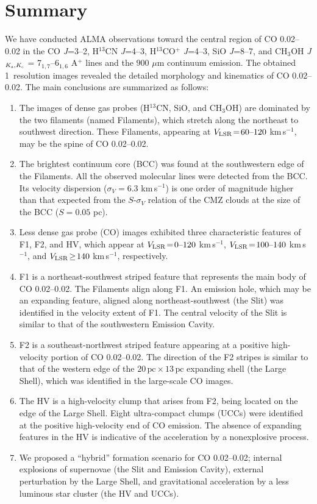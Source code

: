 \documentclass[twocolumn]{aastex631}
\newcommand\kms{\hbox{km$\,$s$^{-1}$}}
\newcommand\VLSR{\hbox{$V_{\rm LSR}$}}
\begin{document}
\section{Summary}
We have conducted ALMA observations toward the central region of CO 0.02--0.02 in the CO {\it J}=3--2, H$^{13}$CN {\it J}=4--3, H$^{13}$CO$^{+}$ {\it J}=4--3, SiO {\it J}=8--7, and CH$_3$OH {\it J}$_{\it K_a, K_c}$ = 7$_{1, 7}$--6$_{1,6}$ A$^{+}$ lines and the $900$ {\rm $\mu$m} continuum emission. The obtained 1\arcsec\ resolution images revealed the detailed morphology and kinematics of CO 0.02--0.02. The main conclusions are summarized as follows:
\begin{enumerate}
\setlength{\itemsep}{0mm}
\setlength{\parsep}{0mm}
\item The images of dense gas probes (H$^{13}$CN, SiO, and CH$_3$OH) are dominated by the two filaments (named Filaments), which stretch along the northeast to southwest direction. These Filaments, appearing at $\VLSR\!=\!60\mbox{--}120$ \kms , may be the spine of CO 0.02--0.02.  
\item The brightest continuum core (BCC) was found at the southwestern edge of the Filaments. All the observed molecular lines were detected from the BCC. Its velocity dispersion ($\sigma_{V}\!=\! 6.3$ \kms ) is one order of magnitude higher than that expected from the $S$-$\sigma_{V}$ relation of the CMZ clouds at the size of the BCC ($S\!=\! 0.05$ pc).
\item Less dense gas probe (CO) images exhibited three characteristic features of F1, F2, and HV, which appear at $\VLSR\!=\! 0\mbox{--}120$ \kms , $\VLSR\!=\! 100\mbox{--}140$ \kms , and $\VLSR\!\geq\! 140$ \kms , respectively.  
\item F1 is a northeast-southwest striped feature that represents the main body of CO 0.02--0.02.  The Filaments align along F1. An emission hole, which may be an expanding feature, aligned along northeast-southwest (the Slit) was identified in the velocity extent of F1. The central velocity of the Slit is similar to that of the southwestern Emission Cavity.  
\item F2 is a southeast-northwest striped feature appearing at a positive high-velocity portion of CO 0.02--0.02. The direction of the F2 stripes is similar to that of the western edge of the $20\,\mbox{pc}\times 13\,\mbox{pc}$ expanding shell (the Large Shell), which was identified in the large-scale CO images.
\item The HV is a high-velocity clump that arises from F2, being located on the edge of the Large Shell. Eight ultra-compact clumps (UCCs) were identified at the positive high-velocity end of CO emission. The absence of expanding features in the HV is indicative of the acceleration by a nonexplosive process.  
\item We proposed a ``hybrid'' formation scenario for CO 0.02--0.02; internal explosions of supernovae (the Slit and Emission Cavity), external perturbation by the Large Shell, and gravitational acceleration by a less luminous star cluster (the HV and UCCs).
\end{enumerate}
\end{document}
